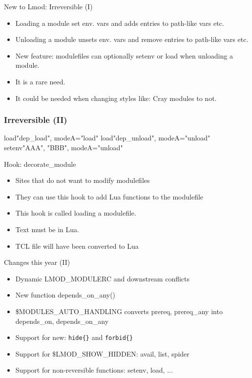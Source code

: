 \documentclass{beamer}
\begin{document}
\begin{frame}{New to Lmod: Irreversible (I)}
  \begin{itemize}
    \item Loading a module set env. vars and adds entries to path-like
      vars etc. 
    \item Unloading a module unsets env. vars and remove entries to
      path-like vars  etc.
    \item New feature: modulefiles can optionally setenv or load when
      unloading a module.
    \item It is a rare need.
    \item It could be needed when changing styles like: Cray modules
      to not. 
  \end{itemize}
\end{frame}

\begin{frame}[fragile]
  \frametitle{Irreversible (II)}
    {\tiny
\begin{semiverbatim}
load{"dep_load", modeA={"load"}}        
load{"dep_unload", modeA={"unload"}}    
setenv{"AAA", "BBB", modeA={"unload"}}  
\end{semiverbatim}
    }
\end{frame}

\begin{frame}{Hook: decorate\_module}
  \begin{itemize}
    \item Sites that do not want to modify modulefiles
    \item They can use this hook to add Lua functions to the modulefile
    \item This hook is called loading a modulefile.
    \item Text must be in Lua.  
    \item TCL file will have been converted to Lua
  \end{itemize}
\end{frame}

\begin{frame}{Changes this year (II)}
  \begin{itemize}
    \item Dynamic LMOD\_MODULERC and downstream conflicts
    \item New function depends\_on\_any()
    \item \$MODULES\_AUTO\_HANDLING converts prereq, prereq\_any into
      depends\_on, depends\_on\_any
    \item Support for new: \texttt{hide\{\}} and \texttt{forbid\{\}}
    \item Support for \$LMOD\_SHOW\_HIDDEN: avail, list, spider
    \item Support for non-reversible functions: setenv, load, ...
  \end{itemize}
\end{frame}
\end{document}
